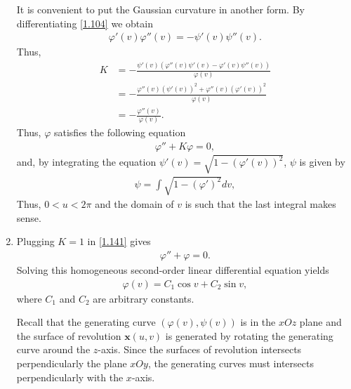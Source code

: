 \documentclass[a4paper]{article}
\numberwithin{equation}{section}
\begin{document}
\begin{enumerate}
It is convenient to put the Gaussian curvature in another form. By differentiating \eqref{1.104} we obtain
\begin{align}
\varphi '\left( v \right)\varphi ''\left( v \right) =  - \psi '\left( v \right)\psi ''\left( v \right).
\end{align} 
Thus, 
\begin{align}
K &=  - \frac{{\psi '\left( v \right)\left( {\varphi ''\left( v \right)\psi '\left( v \right) - \varphi '\left( v \right)\psi ''\left( v \right)} \right)}}{{\varphi \left( v \right)}}\\
 & =  - \frac{{\varphi ''\left( v \right){{\left( {\psi '\left( v \right)} \right)}^2} + \varphi ''\left( v \right){{\left( {\varphi '\left( v \right)} \right)}^2}}}{{\varphi \left( v \right)}}\\
& =  - \frac{{\varphi ''\left( v \right)}}{{\varphi \left( v \right)}}.
\end{align}
Thus, $\varphi$ satisfies the following equation
\begin{align}
\label{1.141}
\varphi '' + K\varphi  = 0,
\end{align}
and, by integrating the equation $\psi '\left( v \right) = \sqrt {1 - {{\left( {\varphi '\left( v \right)} \right)}^2}} $, $\psi$ is given by
\begin{align}
\label{1.142}
\psi  = \int {\sqrt {1 - {{\left( {\varphi '} \right)}^2}} dv} ,
\end{align}
Thus, $0<u<2\pi$ and the domain of $v$ is such that the last integral makes sense.
\item Plugging $K=1$ in \eqref{1.141} gives
\begin{align}
\varphi '' + \varphi =0 .
\end{align}
Solving this homogeneous second-order linear differential equation yields
\begin{align}
\label{1.144}
\varphi \left( v \right) = {C_1}\cos v + {C_2}\sin v,
\end{align}
where $C_1$ and $C_2$ are arbitrary constants.

Recall that the generating curve $\left(\varphi \left(v\right),\psi \left(v\right)\right)$ is in the $xOz$ plane and the surface of revolution $\mathbf{x}\left(u,v\right)$ is generated by rotating the generating curve around the $z$-axis. Since the surfaces of revolution intersects perpendicularly the plane $xOy$, the generating curves must intersects perpendicularly with the $x$-axis.


\end{enumerate}
\end{document}
